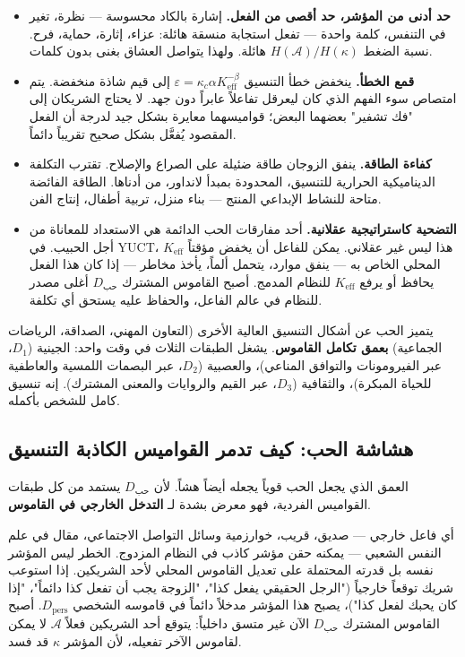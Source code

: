 \documentclass[12pt,a4paper]{article}
\begin{document}
	\begin{itemize}[leftmargin=*]
		\item \textbf{حد أدنى من المؤشر، حد أقصى من الفعل.} إشارة بالكاد محسوسة — نظرة، تغير في التنفس، كلمة واحدة — تفعل استجابة منسقة هائلة: عزاء، إثارة، حماية، فرح. نسبة الضغط \(H(\mathcal{A}) / H(\kappa)\) هائلة. ولهذا يتواصل العشاق بغنى بدون كلمات.
		\item \textbf{قمع الخطأ.} ينخفض خطأ التنسيق \(\varepsilon = \kappa_c \alpha K_{\mathrm{eff}}^{-\beta}\) إلى قيم شاذة منخفضة. يتم امتصاص سوء الفهم الذي كان ليعرقل تفاعلاً عابراً دون جهد. لا يحتاج الشريكان إلى "فك تشفير" بعضهما البعض؛ قواميسهما معايرة بشكل جيد لدرجة أن الفعل المقصود يُفعَّل بشكل صحيح تقريباً دائماً.
		\item \textbf{كفاءة الطاقة.} ينفق الزوجان طاقة ضئيلة على الصراع والإصلاح. تقترب التكلفة الديناميكية الحرارية للتنسيق، المحدودة بمبدأ لانداور، من أدناها. الطاقة الفائضة متاحة للنشاط الإبداعي المنتج — بناء منزل، تربية أطفال، إنتاج الفن.
		\item \textbf{التضحية كاستراتيجية عقلانية.} أحد مفارقات الحب الدائمة هي الاستعداد للمعاناة من أجل الحبيب. في YUCT، هذا ليس غير عقلاني. يمكن للفاعل أن يخفض مؤقتاً \(K_{\mathrm{eff}}\) المحلي الخاص به — ينفق موارد، يتحمل ألماً، يأخذ مخاطر — إذا كان هذا الفعل يحافظ أو يرفع \(K_{\mathrm{eff}}\) للنظام المدمج. أصبح القاموس المشترك \(D_{\text{حب}}\) أغلى مصدر للنظام في عالم الفاعل، والحفاظ عليه يستحق أي تكلفة.
	\end{itemize}
	
	يتميز الحب عن أشكال التنسيق العالية الأخرى (التعاون المهني، الصداقة، الرياضات الجماعية) \textbf{بعمق تكامل القاموس}. يشغل الطبقات الثلاث في وقت واحد: الجينية (\(D_1\)، عبر الفيرومونات والتوافق المناعي)، والعصبية (\(D_2\)، عبر البصمات اللمسية والعاطفية للحياة المبكرة)، والثقافية (\(D_3\)، عبر القيم والروايات والمعنى المشترك). إنه تنسيق كامل للشخص بأكمله.
	
	\subsection{هشاشة الحب: كيف تدمر القواميس الكاذبة التنسيق}
	
	العمق الذي يجعل الحب قوياً يجعله أيضاً هشاً. لأن \(D_{\text{حب}}\) يستمد من كل طبقات القواميس الفردية، فهو معرض بشدة لـ \textbf{التدخل الخارجي في القاموس}.
	
	أي فاعل خارجي — صديق، قريب، خوارزمية وسائل التواصل الاجتماعي، مقال في علم النفس الشعبي — يمكنه حقن مؤشر كاذب في النظام المزدوج. الخطر ليس المؤشر نفسه بل قدرته المحتملة على تعديل القاموس المحلي لأحد الشريكين. إذا استوعب شريك توقعاً خارجياً ("الرجل الحقيقي يفعل كذا"، "الزوجة يجب أن تفعل كذا دائماً"، "إذا كان يحبك لفعل كذا")، يصبح هذا المؤشر مدخلاً دائماً في قاموسه الشخصي \(D_{\text{pers}}\). أصبح القاموس المشترك \(D_{\text{حب}}\) الآن غير متسق داخلياً: يتوقع أحد الشريكين فعلاً \(\mathcal{A}\) لا يمكن لقاموس الآخر تفعيله، لأن المؤشر \(\kappa\) قد فسد.
	
\end{document}
